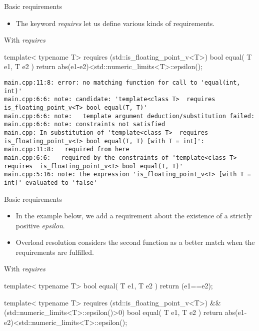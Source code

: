 \begin{frame}[fragile]
  \begin{block}{Basic requirements}
    \begin{itemize}
      \item The keyword {\it requires} let us define various kinds of requirements.
    \end{itemize}
  \end{block}
  \begin{exampleblock}{With {\it requires}}
    \scriptsize
    \begin{cppcode*}{}
    template< typename T>
    requires (std::is_floating_point_v<T>)
    bool equal( T e1, T e2 )
    { return abs(e1-e2)<std::numeric_limits<T>::epsilon(); }
    \end{cppcode*}
    \tiny
    \begin{verbatim}
main.cpp:11:8: error: no matching function for call to 'equal(int, int)'
main.cpp:6:6: note: candidate: 'template<class T>  requires  is_floating_point_v<T> bool equal(T, T)'
main.cpp:6:6: note:   template argument deduction/substitution failed:
main.cpp:6:6: note: constraints not satisfied
main.cpp: In substitution of 'template<class T>  requires  is_floating_point_v<T> bool equal(T, T) [with T = int]':
main.cpp:11:8:   required from here
main.cpp:6:6:   required by the constraints of 'template<class T>  requires  is_floating_point_v<T> bool equal(T, T)'
main.cpp:5:16: note: the expression 'is_floating_point_v<T> [with T = int]' evaluated to 'false'
    \end{verbatim}
  \end{exampleblock}
\end{frame}

\begin{frame}[fragile]
  \begin{block}{Basic requirements}
    \begin{itemize}
      \item In the example below, we add a requirement about the existence of a strictly positive {\it epsilon}.
      \item Overload resolution considers the second function as a better match when the requirements are fulfilled.
    \end{itemize}
  \end{block}
  \begin{exampleblock}{With {\it requires}}
    \scriptsize
    \begin{cppcode*}{}
    template< typename T>
    bool equal( T e1, T e2 )
    { return (e1==e2); }

    template< typename T>
    requires (std::is_floating_point_v<T>)
          && (std::numeric_limits<T>::epsilon()>0)
    bool equal( T e1, T e2 )
    { return abs(e1-e2)<std::numeric_limits<T>::epsilon(); }
    \end{cppcode*}
  \end{exampleblock}
\end{frame}


